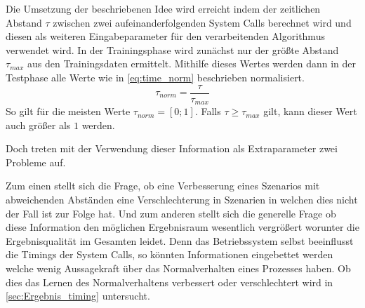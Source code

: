                     Die Umsetzung der beschriebenen Idee wird erreicht indem der zeitlichen Abstand $\tau$ zwischen zwei aufeinanderfolgenden System Calls berechnet wird und diesen als weiteren Eingabeparameter für den verarbeitenden Algorithmus verwendet wird.
                    In der Trainingsphase wird zunächst nur der größte Abstand $\tau_{max}$ aus den Trainingsdaten ermittelt.
                    Mithilfe dieses Wertes werden dann in der Testphase alle Werte wie in \autoref{eq:time_norm} beschrieben normalisiert.
                    \begin{equation}\label{eq:time_norm}
                        \tau_{norm} = \frac{\tau}{\tau_{max}}
                    \end{equation}
                    So gilt für die meisten Werte $\tau_{norm}=[0;1]$.
                    Falls $\tau\geq\tau_{max}$ gilt, kann dieser Wert auch größer als $1$ werden.

                    Doch treten mit der Verwendung dieser Information als Extraparameter zwei Probleme auf.

                    Zum einen stellt sich die Frage, ob eine Verbesserung eines Szenarios mit abweichenden Abständen eine Verschlechterung in Szenarien in welchen dies nicht der Fall ist zur Folge hat.
                    Und zum anderen stellt sich die generelle Frage ob diese Information den möglichen Ergebnisraum wesentlich vergrößert worunter die Ergebnisqualität im Gesamten leidet.
                    Denn das Betriebssystem selbst beeinflusst die Timings der System Calls, so könnten Informationen eingebettet werden welche wenig Aussagekraft über das Normalverhalten eines Prozesses haben.
                    Ob dies das Lernen des Normalverhaltens verbessert oder verschlechtert wird in \autoref{sec:Ergebnis_timing} untersucht.

